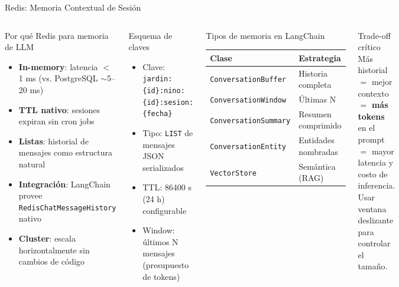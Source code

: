 \documentclass[aspectratio=169]{beamer}
\begin{document}
\begin{frame}{Redis: Memoria Contextual de Sesión}
  \begin{columns}
    \begin{block}{Por qué Redis para memoria de LLM}
      \begin{itemize}
        \item \textbf{In-memory}: latencia $<$ 1 ms (vs. PostgreSQL $\sim$5--20 ms)
        \item \textbf{TTL nativo}: sesiones expiran sin cron jobs
        \item \textbf{Listas}: historial de mensajes como estructura natural
        \item \textbf{Integración}: LangChain provee \texttt{RedisChatMessageHistory} nativo
        \item \textbf{Cluster}: escala horizontalmente sin cambios de código
      \end{itemize}
    \end{block}
    \vspace{0.3em}
    \begin{block}{Esquema de claves}
      \begin{itemize}
        \item Clave: \texttt{jardin:\{id\}:nino:\{id\}:sesion:\{fecha\}}
        \item Tipo: \texttt{LIST} de mensajes JSON serializados
        \item TTL: 86400 s (24 h) configurable
        \item Window: últimos N mensajes (presupuesto de tokens)
      \end{itemize}
    \end{block}
    \begin{exampleblock}{Tipos de memoria en LangChain}
      \begin{tabular}{ll}
        \toprule
        \textbf{Clase} & \textbf{Estrategia} \\
        \midrule
        \texttt{ConversationBuffer} & Historia completa \\
        \texttt{ConversationWindow} & Últimas N \\
        \texttt{ConversationSummary} & Resumen comprimido \\
        \texttt{ConversationEntity} & Entidades nombradas \\
        \texttt{VectorStore} & Semántica (RAG) \\
        \bottomrule
      \end{tabular}
    \end{exampleblock}
    \vspace{0.4em}
    \begin{alertblock}{Trade-off crítico}
      Más historial $=$ mejor contexto $=$ \textbf{más tokens} en el prompt
      $=$ mayor latencia y costo de inferencia.
      Usar ventana deslizante para controlar el tamaño.
    \end{alertblock}
  \end{columns}
\end{frame}
\end{document}
